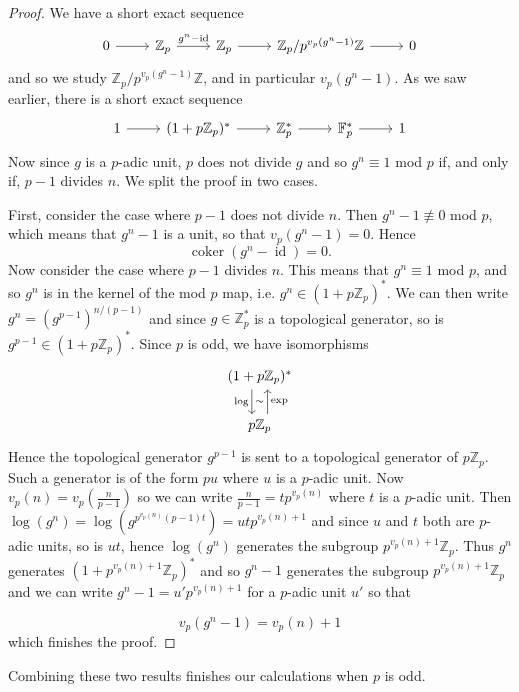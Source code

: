 \documentclass[a4paper]{article} %
\theoremstyle{definition}
\newcommand{\Z}{\mathbb{Z}}
\newcommand{\F}{\mathbb{F}}
\DeclareMathOperator{\id}{id}           %
\DeclareMathOperator{\coker}{coker}     %
\begin{document}
\begin{proof}
We have a short exact sequence
\[
\begin{tikzcd}
0 \rar & \Z_p \rar{g^n - \operatorname{id}} & \Z_p \rar{} & \Z_p/{p^{v_p(g^n-1)}\Z} \rar & 0
\end{tikzcd}
\]
and so we study $\Z_p/{p^{v_p(g^n-1)}\Z}$, and in particular $v_p(g^n-1)$. As we saw earlier, there is a short exact sequence
\[
\begin{tikzcd}
1 \rar & (1+p\Z_p)^* \rar{} & \Z_p^* \rar{} & \F_p^* \rar & 1
\end{tikzcd}
\]
Now since $g$ is a $p$-adic unit, $p$ does not divide $g$ and so $g^n \equiv 1$ mod $p$ if, and only if, $p-1$ divides $n$. We split the proof in two cases.

First, consider the case where $p-1$ does not divide $n$. Then $g^n -1 \not\equiv 0$ mod $p$, which means that $g^n -1$ is a unit, so that $v_p(g^n - 1) = 0$. Hence
\[
\coker ( g^n - \id ) = 0.
\]
Now consider the case where $p-1$ divides $n$. This means that $g^n \equiv 1$ mod $p$, and so $g^n$ is in the kernel of the mod $p$ map, i.e. $g^n \in (1 + p\Z_p)^*$. We can then write $g^n = (g^{p-1})^{n/(p-1)}$ and since $g \in \Z_p^* $ is a topological generator, so is $g^{p-1} \in (1 + p\Z_p)^*$. Since $p$ is odd, we have isomorphisms
\[
\begin{tikzcd}
  (1+ p\Z_p)^* \arrow[d, "\log"', "\sim", shift right=1.3ex] \\
  p\Z_p \arrow[u, "\exp"', shift right = 1.3ex]{exp}
\end{tikzcd}
\]
Hence the topological generator $g^{p-1}$ is sent to a topological generator of $p\Z_p$. Such a generator is of the form $pu$ where $u$ is a $p$-adic unit. Now $v_p(n) = v_p(\frac{n}{p-1})$ so we can write $\frac{n}{p-1} = tp^{v_p(n)}$ where $t$ is a $p$-adic unit. Then $\log(g^n) = \log(g^{p^{v_p(n)}(p-1)t}) = utp^{v_p(n)+1}$ and since $u$ and $t$ both are $p$-adic units, so is $ut$, hence $\log(g^n)$ generates the subgroup $p^{v_p(n)+1}\Z_p$.
Thus $g^n$ generates $(1 + p^{v_p(n)+1}\Z_p)^*$ and so $g^{n}-1$ generates the subgroup $p^{v_p(n)+1}\Z_p$ and we can write $g^n-1 =u' p^{v_p(n)+1}$ for a $p$-adic unit $u'$ so that
\iffalse
But if $g^{p-1} \mapsto pu$ then $g^n \mapsto \frac{n}{p-1}pu$ under $\log$, and $$v_p\left(\frac{n}{p-1}pu\right) = v_p(n)+1.$$ We conclude that \fi
\[
v_p(g^n - 1 ) = v_p(n) + 1
\]
which finishes the proof.
\end{proof}
Combining these two results finishes our calculations when $p$ is odd.
\end{document}
